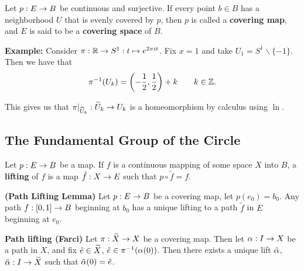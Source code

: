 \vs

\dfn Let $p:E\rightarrow B$ be continuous and surjective. If every point $b\in B$ has a neighborhood $U$ that is evenly covered by $p$, then $p$ is called a \textbf{covering map}, and $E$ is said to be a \textbf{covering space} of $B$.

\vs

\textbf{Example:} Consider $\pi:\mathbb{R} \rightarrow S^1:t \mapsto e^{2\pi i t}$. Fix $x = 1$ and take $U_1 = S^1 \backslash \{-1\}$. Then we have that 
\[\pi^{-1}(U_k) = \left( -\frac{1}{2}, \frac{1}{2}\right) + k\qquad k \in \mathbb{Z}.\]

This gives us that $\pi|_{\widetilde U_k}:\widetilde U_k\rightarrow U_k$ is a homeomorphism by calculus using $\ln$.







\subsection{The Fundamental Group of the Circle}\nl
\setcounter{section}{54}
\setcounter{thm}{0}


\dfn Let $p:E \rightarrow B$ be a map. If $f$ is a continuous mapping of some space $X$ into $B$, a \textbf{lifting} of $f$ is a map $\tilde f:X\rightarrow E$ such that $p\circ \tilde f = f$.
\begin{center}
\end{center}

\vs

\begin{lem}\textbf{(Path Lifting Lemma)}
Let $p:E\rightarrow B$ be a covering map, let $p(e_0) = b_0$. Any path $f:[0,1] \rightarrow B$ beginning at $b_0$ has a unique lifting to a path $\tilde f$ in $E$ beginning at $e_0$.
\end{lem}

\vs

\textbf{Path lifting (Farci)} Let $\pi: \widetilde X \rightarrow X$ be a covering map. Then let $\alpha: I \rightarrow X$ be a path in $X$, and fix $\tilde e\in \widetilde X$, $\tilde e \in \pi^{-1}(\alpha(0))$. Then there exists a unique lift $\tilde{\alpha}$, $\tilde {\alpha}:I \rightarrow \widetilde X$ such that $\tilde {\alpha} (0) = \tilde e$.

